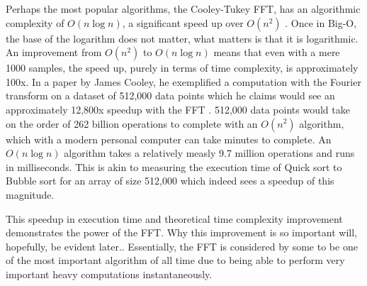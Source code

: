Perhaps the most popular algorithms, the Cooley-Tukey FFT, has an algorithmic complexity of $O(n \log n)$, a significant speed up over $O(n^2)$ \cite{Randhawa2018} \cite{HeidemanEtAl1984}. Once in Big-O, the base of the logarithm does not matter, what matters is that it is logarithmic. An improvement from $O(n^2)$ to $O(n \log n)$ means that even with a mere 1000 samples, the speed up, purely in terms of time complexity, is approximately 100x. In a paper by James Cooley, he exemplified a computation with the Fourier transform on a dataset of 512,000 data points which he claims would see an approximately 12,800x speedup with the FFT \cite{Cooley1987}. 512,000 data points would take on the order of 262 billion operations to complete with an $O(n^2)$ algorithm, which with a modern personal computer can take minutes to complete. An $O(n \log n)$ algorithm takes a relatively measly 9.7 million operations and runs in milliseconds. This is akin to measuring the execution time of Quick sort to Bubble sort for an array of size 512,000 which indeed sees a speedup of this magnitude.

This speedup in execution time and theoretical time complexity improvement demonstrates the power of the FFT. Why this improvement is so important will, hopefully, be evident later.. Essentially, the FFT is considered by some to be one of the most important algorithm of all time due to being able to perform very important heavy computations instantaneously. 


